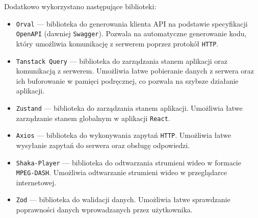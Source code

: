 Dodatkowo wykorzystano następujące biblioteki: 
\begin{itemize}
\item \texttt{Orval} --- biblioteka do generowania klienta API na podstawie specyfikacji \texttt{OpenAPI} (dawniej \texttt{Swagger}). Pozwala na automatyczne generowanie kodu, który umożliwia komunikację z serwerem poprzez protokół \texttt{HTTP}.
\item \texttt{Tanstack Query} --- biblioteka do zarządzania stanem aplikacji oraz komunikacją z serwerem. Umożliwia łatwe pobieranie danych z serwera oraz ich buforowanie w pamięci podręcznej, co pozwala na szybsze działanie aplikacji.
\item \texttt{Zustand} --- biblioteka do zarządzania stanem aplikacji. Umożliwia łatwe zarządzanie stanem globalnym w aplikacji \texttt{React}.
\item \texttt{Axios} --- biblioteka do wykonywania zapytań \texttt{HTTP}. Umożliwia łatwe wysyłanie zapytań do serwera oraz obsługę odpowiedzi.
\item \texttt{Shaka-Player} --- biblioteka do odtwarzania strumieni wideo w formacie \texttt{MPEG-DASH}. Umożliwia odtwarzanie strumieni wideo w przeglądarce internetowej.
\item \texttt{Zod} --- biblioteka do walidacji danych. Umożliwia łatwe sprawdzanie poprawności danych wprowadzanych przez użytkownika. 
\end{itemize}

